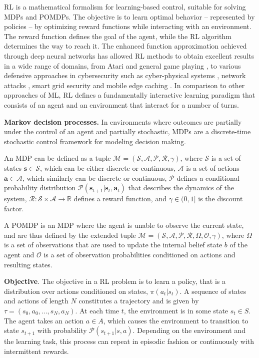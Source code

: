 \gls{RL} is a mathematical formalism for learning-based control, suitable for solving MDPs and POMDPs.
The objective is to learn optimal behavior -- represented by policies -- by optimizing reward functions while interacting with an environment.
The reward function defines the goal of the agent, while the \gls{RL} algorithm determines the way to reach it.
The enhanced function approximation achieved through deep neural networks has allowed \gls{RL} methods to obtain excellent results in a wide range of domains, from Atari and general game playing \cite{Mnih2013}, to various defensive approaches in cybersecurity such as cyber-physical systems \cite{Ferdowsi2018a}, network attacks \cite{Malialis2015}, smart grid security \cite{Ni2019} and mobile edge caching \cite{Xiao2018a}.
In comparison to other approaches of \gls{ML}, \gls{RL} defines a fundamentally interactive learning paradigm that consists of an agent and an environment that interact for a number of turns.

\textbf{Markov decision processes.} In environments where outcomes are partially under the control of an agent and partially stochastic, MDPs are a discrete-time stochastic control framework for modeling decision making.

An MDP can be defined as a tuple
$\mathcal{M} = (\mathcal{S}, \mathcal{A}, \mathcal{P}, \mathcal{R}, \gamma)$, where $\mathcal{S}$ is a set of states $\mathbf{s} \in \mathcal{S}$, which can be either discrete or continuous, $\mathcal{A}$ is a set of actions $\mathbf{a} \in  \mathcal{A}$, which similarly can be discrete or continuous, $ \mathcal{P}$ defines a conditional probability distribution $ \mathcal{P}(\mathbf{s}_{t+1}|\mathbf{s}_t, \mathbf{a}_t)$ that describes the dynamics of the system, $\mathcal{R} :  \mathcal{S} \times  \mathcal{A} \to  \mathbb{R}$ defines a reward function, and $\gamma \in (0, 1]$ is the discount factor.

A POMDP is an MDP where the agent is unable to observe the current state, and are thus defined by the extended tuple 
$\mathcal{M} = (\mathcal{S}, \mathcal{A}, \mathcal{P}, \mathcal{R}, \Omega, \mathcal{O}, \gamma)$, where $\Omega$ is a set of observations that are used to update the internal belief state $b$ of the agent and $\mathcal{O}$ is a set of observation probabilities conditioned on actions and resulting states.

\textbf{Objective}. The objective in a \gls{RL} problem is to learn a policy, that is a distribution over actions conditioned on states, $\pi(a_t|s_t)$.
A sequence of states and actions of length $N$ constitutes a trajectory and is given by $\tau = (s_0, a_0, . . . , s_N, a_N)$.
At each time $t$, the environment is in some state $s_t \in S$.
The agent takes an action $a \in A$, which causes the environment to transition to state $s_{t+1}$ with probability $\mathcal{P}(s_{t+1}|s,a)$.
Depending on the environment and the learning task, this process can repeat in episodic fashion or continuously with intermittent rewards.

